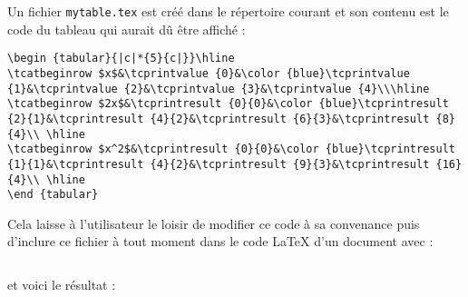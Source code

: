 \documentclass[a4paper,10pt]{article}
\newcommand\mywidth{0.85\linewidth}
\begin{document}
Un fichier \og\verb=mytable.tex=\fg{} est créé dans le répertoire courant et son contenu est le code du tableau qui aurait dû être affiché :
\begin{center}
\begin{minipage}{\mywidth}
\begin{lstlisting}
\begin {tabular}{|c|*{5}{c|}}\hline
\tcatbeginrow $x$&\tcprintvalue {0}&\color {blue}\tcprintvalue {1}&\tcprintvalue {2}&\tcprintvalue {3}&\tcprintvalue {4}\\\hline
\tcatbeginrow $2x$&\tcprintresult {0}{0}&\color {blue}\tcprintresult {2}{1}&\tcprintresult {4}{2}&\tcprintresult {6}{3}&\tcprintresult {8}{4}\\ \hline
\tcatbeginrow $x^2$&\tcprintresult {0}{0}&\color {blue}\tcprintresult {1}{1}&\tcprintresult {4}{2}&\tcprintresult {9}{3}&\tcprintresult {16}{4}\\ \hline
\end {tabular}
\end{lstlisting}
\end{minipage}
\end{center}
Cela laisse à l'utilisateur le loisir de modifier ce code à sa convenance puis d'inclure ce fichier à tout moment dans le code \LaTeX{} d'un document avec :
\begin{center}
\begin{minipage}{\mywidth}
\begin{lstlisting}

\end{lstlisting}
\end{minipage}
\end{center}
et voici le résultat :
\begin{center}

\end{center}
\end{document}
